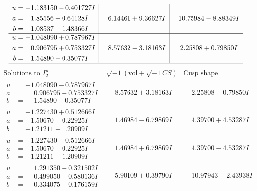 \documentclass[1p]{elsarticle_modified}
\theoremstyle{definition}
\newcommand{\I}{\sqrt{-1}}
\begin{document}
$$\begin{array}{c|c|c}
\begin{aligned}
u &= -1.183150 - 0.401727 I \\
a &= \phantom{-}1.85556 + 0.64128 I \\
b &= \phantom{-}1.08537 + 1.48366 I\end{aligned}
 & \phantom{-}6.14461 + 9.36627 I & \phantom{-}10.75984 - 8.88349 I \\ \hline\begin{aligned}
u &= -1.048090 + 0.787967 I \\
a &= \phantom{-}0.906795 + 0.753327 I \\
b &= \phantom{-}1.54890 - 0.35077 I\end{aligned}
 & \phantom{-}8.57632 - 3.18163 I & \phantom{-}2.25808 + 0.79850 I\\
 \hline 
 \end{array}$$\newpage$$\begin{array}{c|c|c}  
\text{Solutions to }I^u_{2}& \I (\text{vol} + \sqrt{-1}CS) & \text{Cusp shape}\\
 \hline 
\begin{aligned}
u &= -1.048090 - 0.787967 I \\
a &= \phantom{-}0.906795 - 0.753327 I \\
b &= \phantom{-}1.54890 + 0.35077 I\end{aligned}
 & \phantom{-}8.57632 + 3.18163 I & \phantom{-}2.25808 - 0.79850 I \\ \hline\begin{aligned}
u &= -1.227430 + 0.512666 I \\
a &= -1.50670 + 0.22925 I \\
b &= -1.21211 + 1.20909 I\end{aligned}
 & \phantom{-}1.46984 - 6.79869 I & \phantom{-}4.39700 + 4.53287 I \\ \hline\begin{aligned}
u &= -1.227430 - 0.512666 I \\
a &= -1.50670 - 0.22925 I \\
b &= -1.21211 - 1.20909 I\end{aligned}
 & \phantom{-}1.46984 + 6.79869 I & \phantom{-}4.39700 - 4.53287 I \\ \hline\begin{aligned}
u &= \phantom{-}1.291350 + 0.321502 I \\
a &= \phantom{-}0.499050 - 0.580136 I \\
b &= \phantom{-}0.334075 + 0.176159 I\end{aligned}
 & \phantom{-}5.90109 + 0.39790 I & \phantom{-}10.97943 - 2.43938 I \\ \hline\begin{aligned}

\end{aligned}
\end{array}$$
\end{document}
